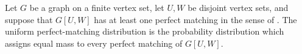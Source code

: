 \begin{definition}
Let $G$ be a graph on a finite vertex set, let $U,W$ be disjoint vertex sets, and suppose that $G[U,W]$ has at least one perfect matching in the sense of .  The uniform perfect-matching distribution is the probability distribution which assigns equal mass to every perfect matching of $G[U,W]$.
\end{definition}
